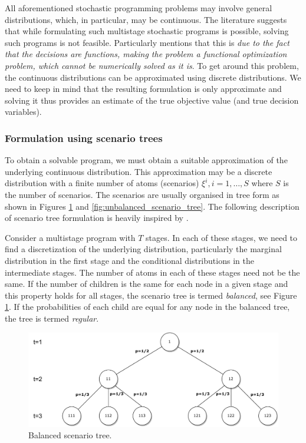 All aforementioned stochastic programming problems may involve general distributions, which, in particular, may be continuous. The literature suggests that while formulating such multistage stochastic programs is possible, solving such programs is not feasible. Particularly \cite{pflugscenariotreegeneration} mentions that this is \textit{due to the fact that the decisions are functions, making the problem a functional optimization problem, which cannot be numerically solved as it is}. To get around this problem, the continuous distributions can be approximated using discrete distributions. We need to keep in mind that the resulting formulation is only approximate and solving it thus provides an estimate of the true objective value (and true decision variables).
\subsubsection{Formulation using scenario trees}
To obtain a solvable program, we must obtain a suitable approximation of the underlying continuous distribution. This approximation may be a discrete distribution with a finite number of atoms (scenarios) $\xi^i, i=1,\dots,S$ where $S$ is the number of scenarios. The scenarios are usually organised in tree form as shown in Figures \ref{fig:balanced_scenario_tree} and \ref{fig:unbalanced_scenario_tree}. The following description of scenario tree formulation is heavily inspired by \cite[Section 2]{dupacova_scenarios_for_multistage_stochastic_programs}.

Consider a multistage program with $T$ stages. In each of these stages, we need to find a discretization of the underlying distribution, particularly the marginal distribution in the first stage and the conditional distributions in the intermediate stages. The number of atoms in each of these stages need not be the same. If the number of children is the same for each node in a given stage and this property holds for all stages, the scenario tree is termed \textit{balanced}, see Figure \ref{fig:balanced_scenario_tree}. If the probabilities of each child are equal for any node in the balanced tree, the tree is termed \textit{regular}. 

\begin{figure}
  \includegraphics[width=\linewidth]{../img/scenario_tree_balanced.pdf}
  \caption{Balanced scenario tree.}
  \label{fig:balanced_scenario_tree}
\end{figure}


